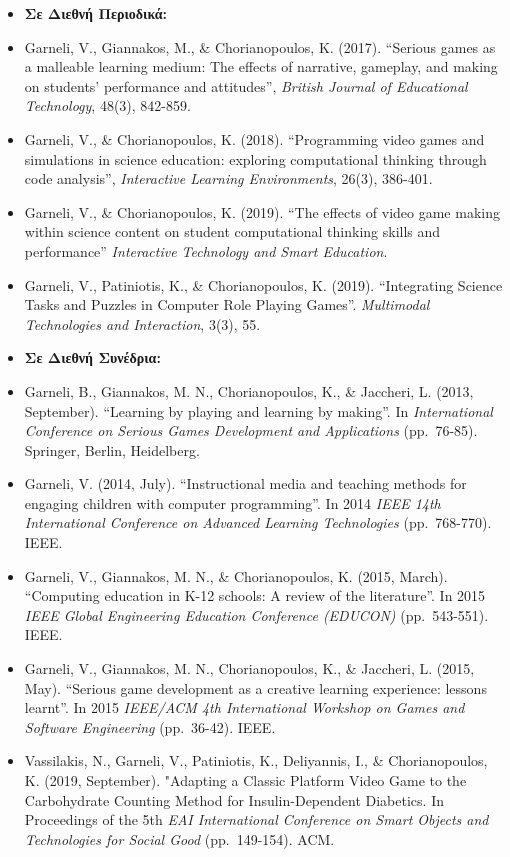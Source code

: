\documentclass[%
    11pt,
  oneside
  ]{memoir}
\begin{document}
\begin{itemize}
\tightlist
\item
  \textbf{Σε Διεθνή Περιοδικά:}
\item
  Garneli, V., Giannakos, M., \& Chorianopoulos, K. (2017). ``Serious
  games as a malleable learning medium: The effects of narrative,
  gameplay, and making on students' performance and attitudes'',
  \emph{British Journal of Educational Technology}, 48(3), 842-859.
\item
  Garneli, V., \& Chorianopoulos, K. (2018). ``Programming video games
  and simulations in science education: exploring computational thinking
  through code analysis'', \emph{Interactive Learning Environments},
  26(3), 386-401.
\item
  Garneli, V., \& Chorianopoulos, K. (2019). ``The effects of video game
  making within science content on student computational thinking skills
  and performance'' \emph{Interactive Technology and Smart Education}.
\item
  Garneli, V., Patiniotis, K., \& Chorianopoulos, K. (2019).
  ``Integrating Science Tasks and Puzzles in Computer Role Playing
  Games''. \emph{Multimodal Technologies and Interaction}, 3(3), 55.
\item
  \textbf{Σε Διεθνή Συνέδρια:}
\item
  Garneli, B., Giannakos, M. N., Chorianopoulos, K., \& Jaccheri, L.
  (2013, September). ``Learning by playing and learning by making''. In
  \emph{International Conference on Serious Games Development and
  Applications} (pp.~76-85). Springer, Berlin, Heidelberg.
\item
  Garneli, V. (2014, July). ``Instructional media and teaching methods
  for engaging children with computer programming''. In 2014 \emph{IEEE
  14th International Conference on Advanced Learning Technologies}
  (pp.~768-770). IEEE.
\item
  Garneli, V., Giannakos, M. N., \& Chorianopoulos, K. (2015, March).
  ``Computing education in K-12 schools: A review of the literature''.
  In 2015 \emph{IEEE Global Engineering Education Conference (EDUCON)}
  (pp.~543-551). IEEE.
\item
  Garneli, V., Giannakos, M. N., Chorianopoulos, K., \& Jaccheri, L.
  (2015, May). ``Serious game development as a creative learning
  experience: lessons learnt''. In 2015 \emph{IEEE/ACM 4th International
  Workshop on Games and Software Engineering} (pp.~36-42). IEEE.
\item
  Vassilakis, N., Garneli, V., Patiniotis, K., Deliyannis, I., \&
  Chorianopoulos, K. (2019, September). "Adapting a Classic Platform
  Video Game to the Carbohydrate Counting Method for Insulin-Dependent
  Diabetics. In Proceedings of the 5th \emph{EAI International
  Conference on Smart Objects and Technologies for Social Good}
  (pp.~149-154). ACM.
\end{itemize}
\end{document}
